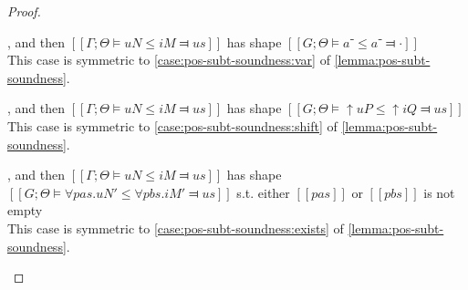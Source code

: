 \begin{proof}
\begin{caseof}
        \item {}, and then $[[Γ ; Θ ⊨ uN ≤ iM ⫤ us]]$ has shape $[[G;Θ ⊨ a⁻ ≤ a⁻ ⫤ ·]]$\\
        This case is symmetric to \cref{case:pos-subt-soundness:var} of \cref{lemma:pos-subt-soundness}.

        \item {}, and then $[[Γ ; Θ ⊨ uN ≤ iM ⫤ us]]$ has shape $[[G;Θ ⊨ ↑uP ≤ ↑iQ ⫤ us]]$\\
        This case is symmetric to \cref{case:pos-subt-soundness:shift} of \cref{lemma:pos-subt-soundness}.

        \item {}, and then $[[Γ ; Θ ⊨ uN ≤ iM ⫤ us]]$ has shape $[[G;Θ ⊨ ∀pas.uN' ≤ ∀pbs.iM' ⫤ us]]$ s.t. either $[[pas]]$ or $[[pbs]]$ is not empty\\
        This case is symmetric to \cref{case:pos-subt-soundness:exists} of \cref{lemma:pos-subt-soundness}.

\end{caseof}
\end{proof}

